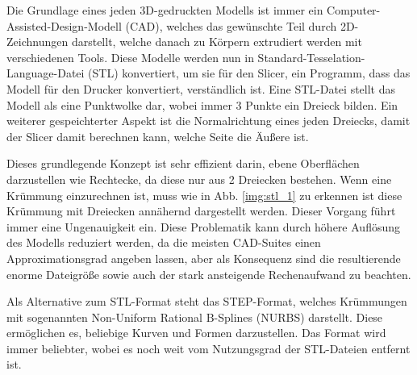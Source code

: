 \documentclass[../main.tex]{subfiles}
\begin{document}
Die Grundlage eines jeden 3D-gedruckten Modells ist immer ein Computer-Assisted-Design-Modell (CAD), welches das gewünschte Teil durch 2D-Zeichnungen darstellt, welche danach zu Körpern extrudiert werden mit verschiedenen Tools. Diese Modelle werden nun in Standard-Tesselation-Language-Datei (STL) konvertiert, um sie für den Slicer, ein Programm, dass das Modell für den Drucker konvertiert, verständlich ist. Eine STL-Datei stellt das Modell als eine Punktwolke dar, wobei immer 3 Punkte ein Dreieck bilden. Ein weiterer gespeichterter Aspekt ist die Normalrichtung eines jeden Dreiecks, damit der Slicer damit berechnen kann, welche Seite die Äußere ist. 

Dieses grundlegende Konzept ist sehr effizient darin, ebene Oberflächen darzustellen wie Rechtecke, da diese nur aus 2 Dreiecken bestehen. Wenn eine Krümmung einzurechnen ist, muss wie in Abb. \ref{img:stl_1} zu erkennen ist diese Krümmung mit Dreiecken annähernd dargestellt werden. Dieser Vorgang führt immer eine Ungenauigkeit ein. Diese Problematik kann durch höhere Auflösung des Modells reduziert werden, da die meisten CAD-Suites einen Approximationsgrad angeben lassen, aber als Konsequenz sind die resultierende enorme Dateigröße sowie auch der stark ansteigende Rechenaufwand zu beachten. \parencite{ADOBLESTL} 

Als Alternative zum STL-Format steht das STEP-Format, welches Krümmungen mit sogenannten Non-Uniform Rational B-Splines (NURBS) darstellt.
Diese ermöglichen es, beliebige Kurven und Formen darzustellen. Das Format wird immer beliebter, wobei es noch weit  vom Nutzungsgrad der STL-Dateien entfernt ist. \parencite{ADOBESTEP}
\end{document}
